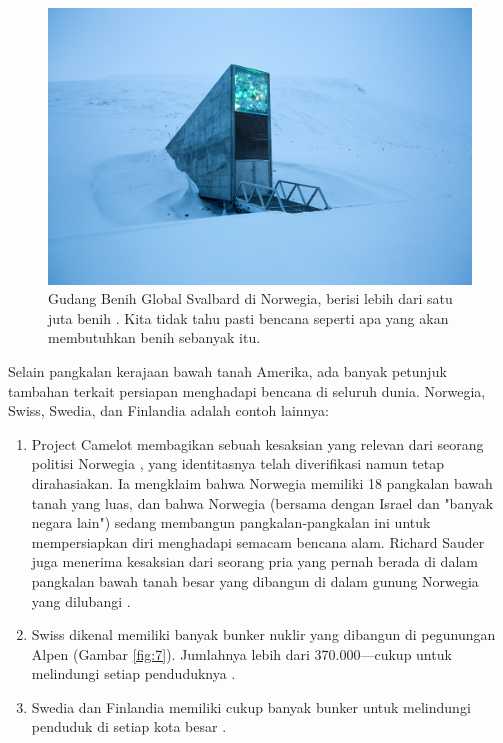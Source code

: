 \documentclass[10pt,twocolumn,letterpaper]{article}
\begin{document}
\begin{figure}[t]
\begin{center}
   \includegraphics[width=1\linewidth]{svalbard.jpg}
\end{center}
   \caption{Gudang Benih Global Svalbard di Norwegia, berisi lebih dari satu juta benih \cite{24}. Kita tidak tahu pasti bencana seperti apa yang akan membutuhkan benih sebanyak itu.}
\label{fig:8}
\label{fig:onecol}
\end{figure}

Selain pangkalan kerajaan bawah tanah Amerika, ada banyak petunjuk tambahan terkait persiapan menghadapi bencana di seluruh dunia. Norwegia, Swiss, Swedia, dan Finlandia adalah contoh lainnya:
\begin{flushleft}
\begin{enumerate}
    \item Project Camelot membagikan sebuah kesaksian yang relevan dari seorang politisi Norwegia \cite{25,26}, yang identitasnya telah diverifikasi namun tetap dirahasiakan. Ia mengklaim bahwa Norwegia memiliki 18 pangkalan bawah tanah yang luas, dan bahwa Norwegia (bersama dengan Israel dan "banyak negara lain") sedang membangun pangkalan-pangkalan ini untuk mempersiapkan diri menghadapi semacam bencana alam. Richard Sauder juga menerima kesaksian dari seorang pria yang pernah berada di dalam pangkalan bawah tanah besar yang dibangun di dalam gunung Norwegia yang dilubangi \cite{22}.
    \item Swiss dikenal memiliki banyak bunker nuklir yang dibangun di pegunungan Alpen (Gambar \ref{fig:7}). Jumlahnya lebih dari 370.000—cukup untuk melindungi setiap penduduknya \cite{27}.
    \item Swedia dan Finlandia memiliki cukup banyak bunker untuk melindungi penduduk di setiap kota besar \cite{27}. 
\end{enumerate}
\end{flushleft}
\end{document}
